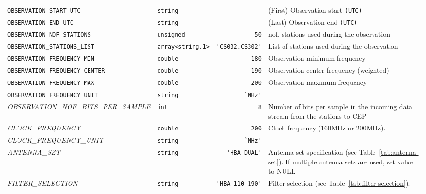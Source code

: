 \begin{table}[htbp]
\begin{tabular}{|lp{1.5cm}rp{5cm}|}
    \small \verb|OBSERVATION_START_UTC| & \small\verb|string|& ---  &  (First) Observation start \verb|(UTC)| \\
    \small{\texttt{OBSERVATION\_END\_UTC}} & \small\verb|string| & ---  &  (Last) Observation end \verb|(UTC)| \\
    \small{\texttt{OBSERVATION\_NOF\_STATIONS}}  & \small\verb|unsigned|& \verb|50|  &  nof. stations used during the observation \\
    \small{\texttt{OBSERVATION\_STATIONS\_LIST}} & \small\verb|array<string,1>| & \verb|'CS032,CS302'|  &  List of stations used during the observation \\
    \small{\texttt{OBSERVATION\_FREQUENCY\_MIN}} & \small\verb|double| & \verb|180|  &  Observation minimum frequency \\
    \small{\texttt{OBSERVATION\_FREQUENCY\_CENTER}} & \small\verb|double| & \verb|190|  &  Observation center frequency (weighted) \\
    \small{\texttt{OBSERVATION\_FREQUENCY\_MAX}} & \small\verb|double| & \verb|200|  &  Observation maximum frequency\\
    \small\verb|OBSERVATION_FREQUENCY_UNIT| & \small\verb|string| &
    \verb|`MHz'|  &  \\
    \small{\textit{OBSERVATION\_NOF\_BITS\_PER\_SAMPLE}} & \small\verb|int| & \verb|8|  & 
    Number of bits per sample in the incoming data stream from the
    stations to CEP \\
    \small{\textit{CLOCK\_FREQUENCY}} & \small\verb|double| & \verb|200|  &  Clock
    frequency ($160 \mathrm{MHz}$ or $200 \mathrm{MHz}$). \\
    \small{\textit{CLOCK\_FREQUENCY\_UNIT}} & \small\verb|string| & \verb|`MHz'| &  \\
    \small{\textit{ANTENNA\_SET}} & \small\verb|string| & \verb|'HBA DUAL'|  &  Antenna set specification (see Table~\ref{tab:antenna-set}). If multiple antenna sets are used, set value to NULL\\
    \small{\textit{FILTER\_SELECTION}} & \small\verb|string| & \verb|'HBA_110_190'|  &  Filter selection (see Table~\ref{tab:filter-selection}).\\

\end{tabular}
\end{table}
